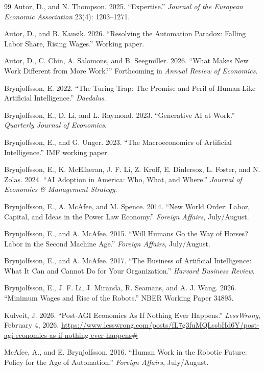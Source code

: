 \documentclass[11pt]{article}
\begin{document}
\begin{thebibliography}{99}
Autor, D., and N. Thompson. 2025.
\newblock ``Expertise.''
\newblock \emph{Journal of the European Economic Association} 23(4): 1203--1271.

Autor, D., and B. Kausik. 2026.
\newblock ``Resolving the Automation Paradox: Falling Labor Share, Rising Wages.''
\newblock Working paper.

Autor, D., C. Chin, A. Salomons, and B. Seegmiller. 2026.
\newblock ``What Makes New Work Different from More Work?''
\newblock Forthcoming in \emph{Annual Review of Economics}.

Brynjolfsson, E. 2022.
\newblock ``The Turing Trap: The Promise and Peril of Human-Like Artificial Intelligence.''
\newblock \emph{Daedalus}.

Brynjolfsson, E., D. Li, and L. Raymond. 2023.
\newblock ``Generative AI at Work.''
\newblock \emph{Quarterly Journal of Economics}.

Brynjolfsson, E., and G. Unger. 2023.
\newblock ``The Macroeconomics of Artificial Intelligence.''
\newblock IMF working paper.

Brynjolfsson, E., K. McElheran, J. F. Li, Z. Kroff, E. Dinlersoz, L. Foster, and N. Zolas. 2024.
\newblock ``AI Adoption in America: Who, What, and Where.''
\newblock \emph{Journal of Economics \& Management Strategy}.

Brynjolfsson, E., A. McAfee, and M. Spence. 2014.
\newblock ``New World Order: Labor, Capital, and Ideas in the Power Law Economy.''
\newblock \emph{Foreign Affairs}, July/August.

Brynjolfsson, E., and A. McAfee. 2015.
\newblock ``Will Humans Go the Way of Horses? Labor in the Second Machine Age.''
\newblock \emph{Foreign Affairs}, July/August.

Brynjolfsson, E., and A. McAfee. 2017.
\newblock ``The Business of Artificial Intelligence: What It Can and Cannot Do for Your Organization.''
\newblock \emph{Harvard Business Review}.

Brynjolfsson, E., J. F. Li, J. Miranda, R. Seamans, and A. J. Wang. 2026.
\newblock ``Minimum Wages and Rise of the Robots.''
\newblock NBER Working Paper 34895.

Kulveit, J. 2026.
\newblock ``Post-AGI Economics As If Nothing Ever Happens.''
\newblock \emph{LessWrong}, February 4, 2026.
\newblock \url{https://www.lesswrong.com/posts/fL7g3fuMQLssbHd6Y/post-agi-economics-as-if-nothing-ever-happens\#}

McAfee, A., and E. Brynjolfsson. 2016.
\newblock ``Human Work in the Robotic Future: Policy for the Age of Automation.''
\newblock \emph{Foreign Affairs}, July/August.

\end{thebibliography}
\end{document}
